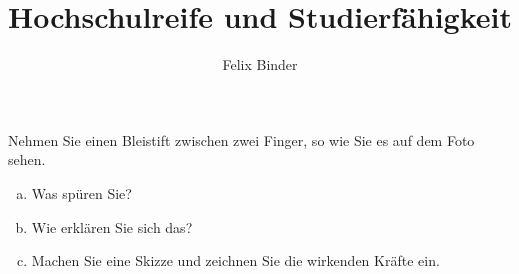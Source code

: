 \documentclass{beamer}%
\title{Hochschulreife und Studierfähigkeit}
\author[Felix Binder]{Felix Binder}
\begin{document}

\begin{frame}
Nehmen Sie einen Bleistift zwischen zwei Finger, so wie Sie es auf dem Foto sehen.
	\begin{center}%
	\end{center}%
\begin{enumerate} [a)]
\item Was spüren Sie?
\item Wie erklären Sie sich das?
\item Machen Sie eine Skizze und zeichnen Sie die wirkenden Kräfte ein.
\end{enumerate}%
\end{frame}
\end{document}
